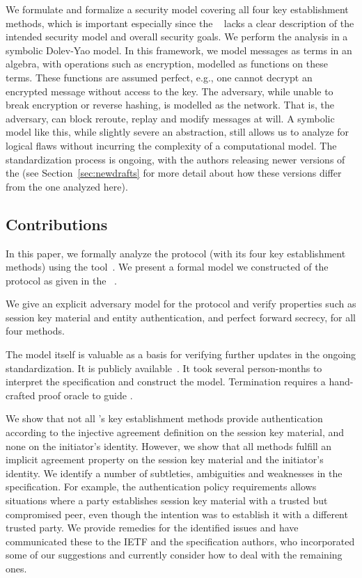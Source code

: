 \documentclass[a4paper,twoside,draft]{article}
\begin{document}
We formulate and formalize a security model covering all four key
establishment methods, which is important especially since the
\mSpec{}~\cite{our-analysis-selander-lake-edhoc-00} lacks a clear description
of the intended security model and overall security goals.
%
We perform the analysis in a symbolic Dolev-Yao model.
In this framework, we model messages as terms in an algebra, with operations such
as encryption, modelled as functions on these terms.
These functions are assumed perfect, e.g., one cannot decrypt an encrypted
message without access to the key.
The adversary, while unable to break encryption or reverse hashing, is modelled
as the network.
That is, the adversary, can block reroute, replay and modify messages at will.
A symbolic model like this, while slightly severe an abstraction, still allows
us to analyze \mEdhoc{} for logical flaws without incurring the complexity of
a computational model.
%
The standardization process is ongoing, with the authors releasing newer
versions of the \mSpec{} (see Section~\ref{sec:newdrafts} for more detail
about how these versions differ from the one analyzed here).
%

\subsection{Contributions}
\label{sec:contributions}
In this paper, we formally analyze the \mEdhoc{} protocol (with its four key
establishment methods) using the \mTamarin{} tool~\cite{DBLP:conf/cav/MeierSCB13}.
%
We present a formal model we constructed of the protocol as given in the
\mSpec{}~\cite{our-analysis-selander-lake-edhoc-00}.
%

We give an explicit adversary model for the protocol and verify
properties such as session key material and entity authentication, and perfect
forward secrecy, for all four methods.
%

The model itself is valuable as a basis for verifying further updates in the
ongoing standardization.
%
It is publicly available~\cite{edhocTamarinRepo}.
%
It took several person-months to interpret the
specification and construct the model.
%
Termination requires a hand-crafted proof oracle to guide \mTamarin{}.
%

We show that not all \mEdhoc{}'s key establishment
methods provide authentication according to the injective agreement definition
on the session key material, and none on the initiator's identity.
%
However, we show that all methods fulfill an implicit agreement property on
the session key material and the initiator's identity.
%
We identify a number of subtleties, ambiguities and weaknesses in the
specification.
%
For example, the authentication policy requirements allows situations where a
party establishes session key material with a trusted but compromised peer, even
though the intention was to establish it with a different trusted party.
%
We provide remedies for the identified issues and have
communicated these to the IETF and the specification authors, who incorporated
some of our suggestions and currently consider how to deal with the remaining
ones.
%
\end{document}
